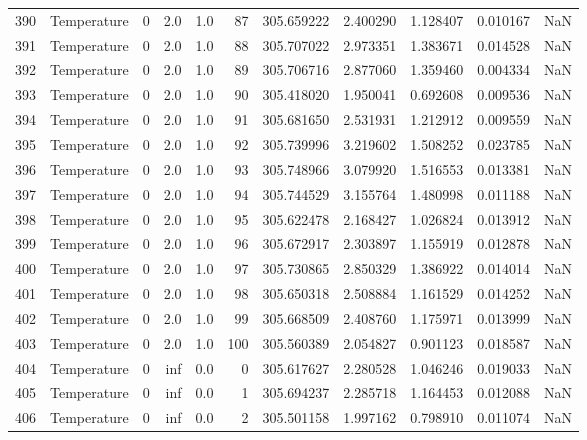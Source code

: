 \begin{tabular}{llrrrrrrrrr}
390 &  Temperature &       0 &  2.0 &  1.0 &   87 &  305.659222 &  2.400290 &  1.128407 &   0.010167 &      NaN \\
391 &  Temperature &       0 &  2.0 &  1.0 &   88 &  305.707022 &  2.973351 &  1.383671 &   0.014528 &      NaN \\
392 &  Temperature &       0 &  2.0 &  1.0 &   89 &  305.706716 &  2.877060 &  1.359460 &   0.004334 &      NaN \\
393 &  Temperature &       0 &  2.0 &  1.0 &   90 &  305.418020 &  1.950041 &  0.692608 &   0.009536 &      NaN \\
394 &  Temperature &       0 &  2.0 &  1.0 &   91 &  305.681650 &  2.531931 &  1.212912 &   0.009559 &      NaN \\
395 &  Temperature &       0 &  2.0 &  1.0 &   92 &  305.739996 &  3.219602 &  1.508252 &   0.023785 &      NaN \\
396 &  Temperature &       0 &  2.0 &  1.0 &   93 &  305.748966 &  3.079920 &  1.516553 &   0.013381 &      NaN \\
397 &  Temperature &       0 &  2.0 &  1.0 &   94 &  305.744529 &  3.155764 &  1.480998 &   0.011188 &      NaN \\
398 &  Temperature &       0 &  2.0 &  1.0 &   95 &  305.622478 &  2.168427 &  1.026824 &   0.013912 &      NaN \\
399 &  Temperature &       0 &  2.0 &  1.0 &   96 &  305.672917 &  2.303897 &  1.155919 &   0.012878 &      NaN \\
400 &  Temperature &       0 &  2.0 &  1.0 &   97 &  305.730865 &  2.850329 &  1.386922 &   0.014014 &      NaN \\
401 &  Temperature &       0 &  2.0 &  1.0 &   98 &  305.650318 &  2.508884 &  1.161529 &   0.014252 &      NaN \\
402 &  Temperature &       0 &  2.0 &  1.0 &   99 &  305.668509 &  2.408760 &  1.175971 &   0.013999 &      NaN \\
403 &  Temperature &       0 &  2.0 &  1.0 &  100 &  305.560389 &  2.054827 &  0.901123 &   0.018587 &      NaN \\
404 &  Temperature &       0 &  inf &  0.0 &    0 &  305.617627 &  2.280528 &  1.046246 &   0.019033 &      NaN \\
405 &  Temperature &       0 &  inf &  0.0 &    1 &  305.694237 &  2.285718 &  1.164453 &   0.012088 &      NaN \\
406 &  Temperature &       0 &  inf &  0.0 &    2 &  305.501158 &  1.997162 &  0.798910 &   0.011074 &      NaN \\

\end{tabular}
